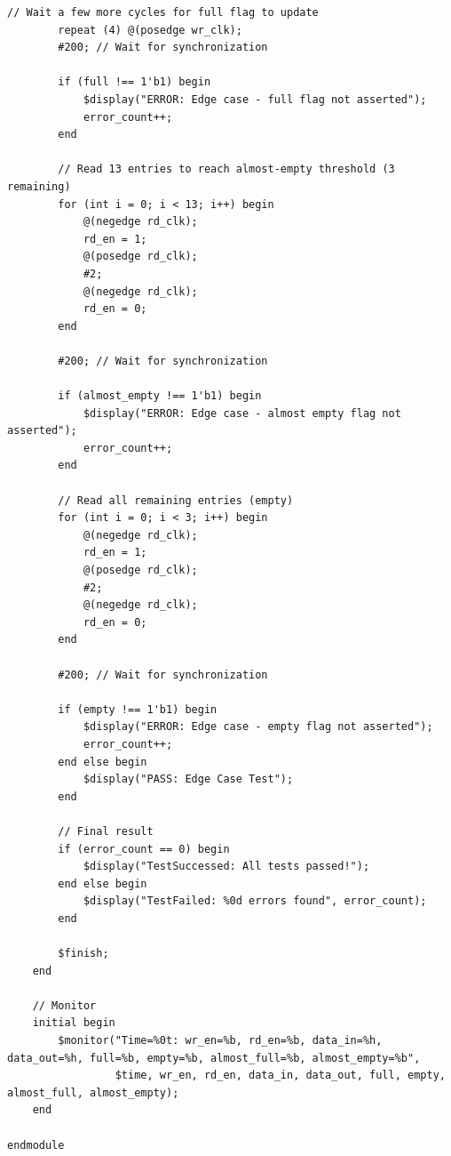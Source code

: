\documentclass[UTF8]{ctexart}
\begin{document}
\begin{lstlisting}[frame=shadowbox,caption=tb\_async\_fifo.sv]
        // Wait a few more cycles for full flag to update
        repeat (4) @(posedge wr_clk);
        #200; // Wait for synchronization
        
        if (full !== 1'b1) begin
            $display("ERROR: Edge case - full flag not asserted");
            error_count++;
        end
        
        // Read 13 entries to reach almost-empty threshold (3 remaining)
        for (int i = 0; i < 13; i++) begin
            @(negedge rd_clk);
            rd_en = 1;
            @(posedge rd_clk);
            #2;
            @(negedge rd_clk);
            rd_en = 0;
        end
        
        #200; // Wait for synchronization
        
        if (almost_empty !== 1'b1) begin
            $display("ERROR: Edge case - almost empty flag not asserted");
            error_count++;
        end
        
        // Read all remaining entries (empty)
        for (int i = 0; i < 3; i++) begin
            @(negedge rd_clk);
            rd_en = 1;
            @(posedge rd_clk);
            #2;
            @(negedge rd_clk);
            rd_en = 0;
        end
        
        #200; // Wait for synchronization
        
        if (empty !== 1'b1) begin
            $display("ERROR: Edge case - empty flag not asserted");
            error_count++;
        end else begin
            $display("PASS: Edge Case Test");
        end
        
        // Final result
        if (error_count == 0) begin
            $display("TestSuccessed: All tests passed!");
        end else begin
            $display("TestFailed: %0d errors found", error_count);
        end
        
        $finish;
    end
    
    // Monitor
    initial begin
        $monitor("Time=%0t: wr_en=%b, rd_en=%b, data_in=%h, data_out=%h, full=%b, empty=%b, almost_full=%b, almost_empty=%b", 
                 $time, wr_en, rd_en, data_in, data_out, full, empty, almost_full, almost_empty);
    end

endmodule
\end{lstlisting}
\end{document}
